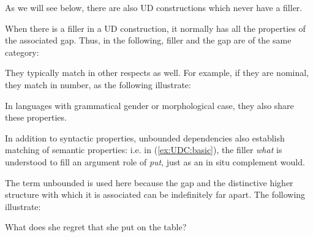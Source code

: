 \documentclass[output=paper
                ,modfonts
                ,nonflat
	        ,collection
	        ,collectionchapter
	        ,collectiontoclongg
 	        ,biblatex
                ,babelshorthands
                ,newtxmath
                ,draftmode
                ,colorlinks, citecolor=brown
]{./langsci/langscibook}
\begin{document}
{\noindent
As we will see below, there are also UD constructions which never have a
filler.

When there is a filler in a UD construction, it normally has all the
properties of the associated gap. Thus, in the following, filler and the
gap are of the same category:

\begin{exe} \ex \begin{xlist} \label{ex:UDC:3}



\end{xlist}
\end{exe}

\noindent
They typically match in other respects as well. For example, if they are
nominal, they match in number, as the following illustrate:

\begin{exe} \ex \begin{xlist} \label{ex:UDC:4}

\end{xlist}
\end{exe}

\noindent
In languages with grammatical gender or morphological case, they also
share these properties.

In addition to syntactic properties, unbounded dependencies also establish
matching of semantic properties: i.e. in (\ref{ex:UDC:basic}), the
filler \textit{what} is understood to fill an argument role of
\textit{put}, just as an in situ complement would.

The term unbounded is used here because the gap and the distinctive
higher structure with which it is associated can be indefinitely far
apart. The following illustrate:

\begin{exe} \ex \begin{xlist} \label{ex:UDC:5}
\ex What does she regret that she put   \gap{} on the table?


\end{xlist}
\end{exe}}
\end{document}
